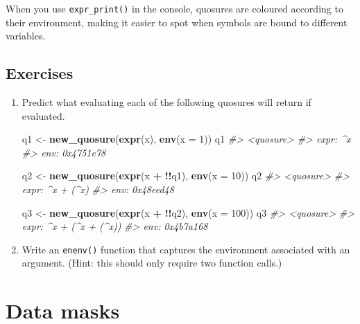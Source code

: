 \documentclass[]{book}
\newenvironment{Shaded}{\begin{snugshade}}{\end{snugshade}}
\newcommand{\CommentTok}[1]{\textcolor[rgb]{0.37,0.37,0.37}{\textit{#1}}}
\newcommand{\DataTypeTok}[1]{\textcolor[rgb]{0.27,0.27,0.27}{#1}}
\newcommand{\DecValTok}[1]{\textcolor[rgb]{0.06,0.06,0.06}{#1}}
\newcommand{\KeywordTok}[1]{\textcolor[rgb]{0.27,0.27,0.27}{\textbf{#1}}}
\newcommand{\NormalTok}[1]{#1}
\newcommand{\OperatorTok}[1]{\textcolor[rgb]{0.43,0.43,0.43}{\textbf{#1}}}
\newcommand{\StringTok}[1]{\textcolor[rgb]{0.5,0.5,0.5}{#1}}
\begin{document}
When you use \texttt{expr\_print()} in the console, quosures are coloured according to their environment, making it easier to spot when symbols are bound to different variables.

\hypertarget{exercises-10}{%
\subsection{Exercises}\label{exercises-10}}

\begin{enumerate}
\def\labelenumi{\arabic{enumi}.}
\item
  Predict what evaluating each of the following quosures will return if
  evaluated.

\begin{Shaded}
\begin{Highlighting}[]
\NormalTok{q1 <-}\StringTok{ }\KeywordTok{new_quosure}\NormalTok{(}\KeywordTok{expr}\NormalTok{(x), }\KeywordTok{env}\NormalTok{(}\DataTypeTok{x =} \DecValTok{1}\NormalTok{))}
\NormalTok{q1}
\CommentTok{#> <quosure>}
\CommentTok{#> expr: ^x}
\CommentTok{#> env:  0x4751e78}

\NormalTok{q2 <-}\StringTok{ }\KeywordTok{new_quosure}\NormalTok{(}\KeywordTok{expr}\NormalTok{(x }\OperatorTok{+}\StringTok{ }\OperatorTok{!!}\NormalTok{q1), }\KeywordTok{env}\NormalTok{(}\DataTypeTok{x =} \DecValTok{10}\NormalTok{))}
\NormalTok{q2}
\CommentTok{#> <quosure>}
\CommentTok{#> expr: ^x + (^x)}
\CommentTok{#> env:  0x48eed48}

\NormalTok{q3 <-}\StringTok{ }\KeywordTok{new_quosure}\NormalTok{(}\KeywordTok{expr}\NormalTok{(x }\OperatorTok{+}\StringTok{ }\OperatorTok{!!}\NormalTok{q2), }\KeywordTok{env}\NormalTok{(}\DataTypeTok{x =} \DecValTok{100}\NormalTok{))}
\NormalTok{q3}
\CommentTok{#> <quosure>}
\CommentTok{#> expr: ^x + (^x + (^x))}
\CommentTok{#> env:  0x4b7a168}
\end{Highlighting}
\end{Shaded}
\item
  Write an \texttt{enenv()} function that captures the environment associated
  with an argument. (Hint: this should only require two function calls.)
\end{enumerate}

\hypertarget{data-masks}{%
\section{Data masks}\label{data-masks}}

\end{document}
